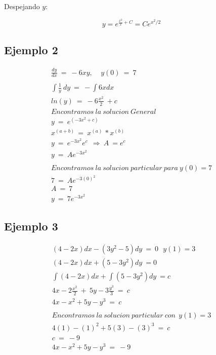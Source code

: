 Despejando \( y \):

\begin{equation}
y = e^{\frac{x^2}{2} + C} = Ce^{x^2/2}
\end{equation}


\subsection*{Ejemplo 2}

\begin{gather*}
\frac{dy}{dx} \ =\ -6xy,\ \ \ \ \ y( 0) \ =\ 7\\
\\
\int \frac{1}{y} \ dy\ =\ -\int 6xdx\\
ln( y) \ =\ -6\frac{x^{2}}{2} \ +c\\
Encontramos\ la\ solucion\ General\\
y\ =\ e^{\left( -3x^{2} +c\right)}\\
x^{( a+b) \ } =\ x^{( a) \ } *x^{( b) \ }\\
y\ =\ e^{-3x^{2}} e^{c} \ \ \Longrightarrow \ A\ =e^{c} \ \\
y\ =\ Ae^{-3x^{2}}\\
\\
Encontramos\ la\ solucion\ particular\ para\ y( 0) =7\\
7\ =\ Ae^{-3( 0)^{2}}\\
A\ =\ 7\\
y\ =\ 7e^{-3x^{2}}
\end{gather*}
\subsection*{Ejemplo 3}


\begin{gather*}
( 4-2x) dx-\left( 3y^{2} -5\right) dy\ =\ 0\ \ \ y( 1) =3\\
( 4-2x) dx+\left( 5-3y^{2}\right) dy\ =0\\
\int ( 4-2x) dx+\int \left( 5-3y^{2}\right) dy\ =c\\
4x-2\frac{x^{2}}{2} \ +\ 5y-3\frac{y^{3}}{3} \ =\ c\\
4x-x^{2} +5y-y^{3} \ =\ c\\
\\
Encontramos\ la\ solucion\ particular\ con\ \ y( 1) =3\\
4( 1) -( 1)^{2} +5( 3) -( 3)^{3} \ =\ c\\
c\ =\ -9\\
4x-x^{2} +5y-y^{3} \ =\ -9
\end{gather*}

